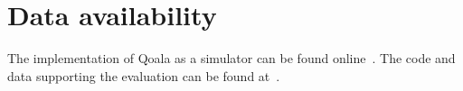 \section{Data availability}
The implementation of Qoala as a simulator can be found online~\cite{qoala2023simulator}.
The code and data supporting the evaluation can be found at~\cite{qoala-evaluation-data}.






\fi


\begin{xstretch}
\printbibliography[heading=subbibintoc,title={References},notcategory=noprint]
\end{xstretch}